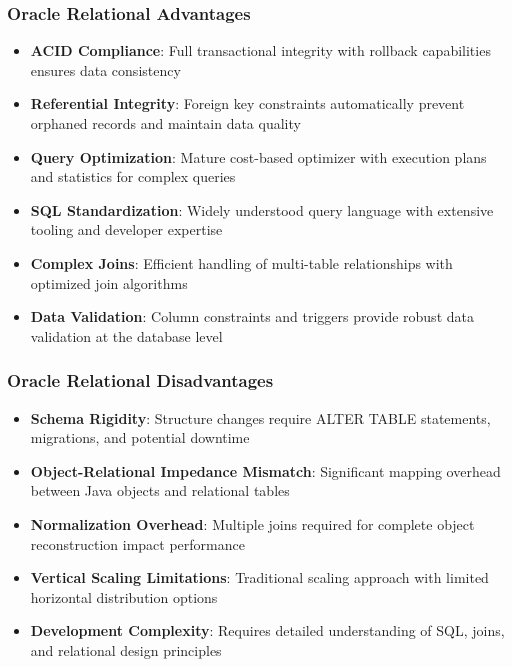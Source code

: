 \documentclass[12pt,a4paper]{article}
\begin{document}
\subsubsection{Oracle Relational Advantages}
\begin{itemize}
    \item \textbf{ACID Compliance}: Full transactional integrity with rollback capabilities ensures data consistency
    \item \textbf{Referential Integrity}: Foreign key constraints automatically prevent orphaned records and maintain data quality
    \item \textbf{Query Optimization}: Mature cost-based optimizer with execution plans and statistics for complex queries
    \item \textbf{SQL Standardization}: Widely understood query language with extensive tooling and developer expertise
    \item \textbf{Complex Joins}: Efficient handling of multi-table relationships with optimized join algorithms
    \item \textbf{Data Validation}: Column constraints and triggers provide robust data validation at the database level
\end{itemize}

\subsubsection{Oracle Relational Disadvantages}
\begin{itemize}
    \item \textbf{Schema Rigidity}: Structure changes require ALTER TABLE statements, migrations, and potential downtime
    \item \textbf{Object-Relational Impedance Mismatch}: Significant mapping overhead between Java objects and relational tables
    \item \textbf{Normalization Overhead}: Multiple joins required for complete object reconstruction impact performance
    \item \textbf{Vertical Scaling Limitations}: Traditional scaling approach with limited horizontal distribution options
    \item \textbf{Development Complexity}: Requires detailed understanding of SQL, joins, and relational design principles
\end{itemize}
\end{document}
